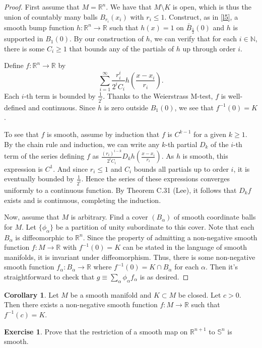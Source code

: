 \documentclass[10pt,letterpaper,cm]{nupset}
\theoremstyle{definition}
\theoremstyle{theorem}
\newtheorem{corollary}[definition]{Corollary}
\newtheorem{exercise}[definition]{Exercise}
\theoremstyle{remark}
\newcommand{\N}{\mathbb N}
\newcommand{\R}{\mathbb R}
\renewcommand{\S}{\mathbb S}
\newcommand{\1}{\mathbf{1}}
\newcommand{\0}{\vec 0}
\begin{document}
\begin{proof}
First assume that $M=\R^n$. We have that $M\setminus K$ is open, which is thus the union of countably many balls $B_{r_i}(x_i)$ with $r_i \leq 1$. Construct, as in \cref{l5}, a smooth bump function $h: \R^n \to \R$ such that
 $h(x) =1$ on $\bar{B}_{\frac{1}{2}}(0)$ and  $h$ is supported in $B_1(0)$.  By our construction of $h$, we can verify that for each $i\in \N$, there is some $C_i \geq 1$ that bounds any of the partials of $h$ up through order $i$. 

 Define $f: \R^n \to \R$ by $$\sum_{i=1}^\infty \frac{r_i^i}{2^iC_i}h \left(\frac{x-x_i}{r_i}\right).$$ Each $i$-th term is bounded by $\frac{1}{2^i}$. Thanks to the Weierstrass M-test, $f$ is well-defined and continuous. Since $h$ is zero outside $B_1(0)$, we see that $f^{-1}(0) = K$. 
 
 To see that $f$ is smooth, assume by induction that $f$ is $C^{k-1}$ for a given $k \geq 1$. By the chain rule and induction, we can write any $k$-th partial $D_k$ of the $i$-th term of the series defining $f$ as $\frac{(r_i)^{i-k}}{2^iC_i} D_kh(\frac{x-x_i}{r_i})$. As $h$ is smooth, this expression is $C^1$. And since $r_i \leq 1$ and $C_i$ bounds all partials up to order $i$, it is eventually bounded by $\frac{1}{2^i}$. Hence the series of these expressions converges uniformly to a continuous function. By Theorem C.31 (Lee), it follows that $D_kf$ exists and is continuous, completing the induction. 

 Now, assume that $M$ is arbitrary. Find a cover $(B_\alpha)$ of smooth coordinate balls for $M$. Let $\{\phi_\alpha\}$ be a partition of unity subordinate to this cover. Note that each $B_\alpha$ is diffeomorphic to $\R^n$. Since the property of admitting a non-negative smooth function $f: M \to \R$ with $f^{-1}(0) = K$ can be stated in the language of smooth manifolds, it is invariant under diffeomorphism. Thus, there is some non-negative smooth function $f_\alpha : B_\alpha \to \R$ where $f^{-1}(0) = K \cap B_\alpha$ for each $\alpha$. Then it's straightforward to check that $g \equiv \sum_{\alpha} \phi_\alpha f_\alpha$ is as desired.
\end{proof}

\begin{corollary}
Let $M$ be a smooth manifold and $K \subset M$ be closed. Let $c >0$. Then there exists a non-negative smooth function $f: M \to \R$ such that $f^{-1}(c) =K$.
\end{corollary}

\begin{exercise}
Prove that the restriction of a smooth map on $\R^{n+1}$ to $\S^n$ is smooth. 
\end{exercise}
\end{document}
